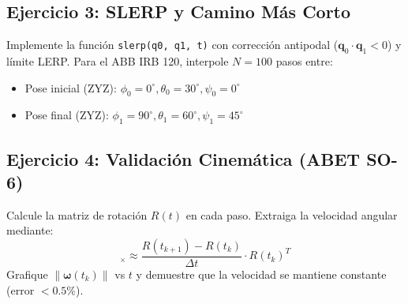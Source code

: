 \documentclass[11pt, a4paper]{article}
\begin{document}
\subsection*{Ejercicio 3: SLERP y Camino Más Corto}
Implemente la función \texttt{slerp(q0, q1, t)} con corrección antipodal ($\mathbf{q}_0 \cdot \mathbf{q}_1 < 0$) y límite LERP. Para el ABB IRB 120, interpole $N=100$ pasos entre:
\begin{itemize}[label=$\circ$]
    \item Pose inicial (ZYZ): $\phi_0 = 0^\circ, \theta_0 = 30^\circ, \psi_0 = 0^\circ$
    \item Pose final (ZYZ): $\phi_1 = 90^\circ, \theta_1 = 60^\circ, \psi_1 = 45^\circ$
\end{itemize}

\subsection*{Ejercicio 4: Validación Cinemática (ABET SO-6)}
Calcule la matriz de rotación $R(t)$ en cada paso. Extraiga la velocidad angular mediante:
\begin{equation*}
    [\boldsymbol{\omega}(t_k)]_\times \approx \frac{R(t_{k+1}) - R(t_k)}{\Delta t} \cdot R(t_k)^T
\end{equation*}
Grafique $\left\|\boldsymbol{\omega}(t_k)\right\|$ vs $t$ y demuestre que la velocidad se mantiene constante (error $<0.5\%$).



\end{document}
